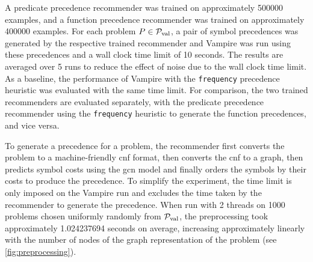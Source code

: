A predicate precedence recommender was trained on approximately \num{500000} examples,
and a function precedence recommender was trained on approximately \num{400000} examples.
For each problem $P \in \operatorname{\mathcal{P}_{\mathrm{val}}}$,
a pair
 of symbol precedences was generated by the respective trained recommender
and Vampire was run using these precedences and a wall clock time limit of 10 seconds.
The results are averaged over 5 runs to reduce the effect of noise due to the wall clock time limit.
As a baseline, the performance of Vampire with the \texttt{frequency} precedence heuristic was evaluated
with the same time limit.
For comparison, the two trained recommenders are evaluated separately,
with the predicate precedence recommender using the \texttt{frequency} heuristic to generate the function precedences, and vice versa.

To generate a precedence for a problem,
the recommender first converts the problem to a machine-friendly \gls{cnf} format,
then converts the \gls{cnf} to a graph,
then predicts symbol costs using the \gls{gcn} model
and finally orders the symbols by their costs to produce the precedence.
To simplify the experiment, the time limit is only imposed on the Vampire run
and excludes the time taken by the recommender to generate the precedence.
When run with 2 threads on 1000 problems chosen uniformly randomly from $\operatorname{\mathcal{P}_{\mathrm{val}}}$,
the preprocessing took
approximately \num[round-mode=places,round-precision=2]{1.024237694} seconds on average,
increasing approximately linearly with the number of nodes of the graph representation of the problem
(see \cref{fig:preprocessing}).

